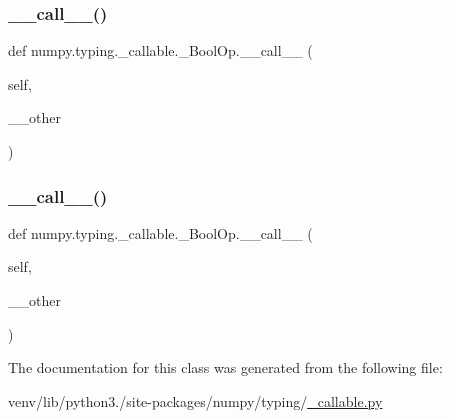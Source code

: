 \subsubsection{\texorpdfstring{\+\_\+\+\_\+call\+\_\+\+\_\+()}{\_\_call\_\_()}\hspace{0.1cm}{\footnotesize\ttfamily [4/5]}}
{\footnotesize\ttfamily def numpy.\+typing.\+\_\+callable.\+\_\+\+Bool\+Op.\+\_\+\+\_\+call\+\_\+\+\_\+ (\begin{DoxyParamCaption}\item[{}]{self,  }\item[{}]{\+\_\+\+\_\+other }\end{DoxyParamCaption})}

\mbox{\label{classnumpy_1_1typing_1_1__callable_1_1__BoolOp_af99dcaaa1aa2881d3ed4ad2f8663d85e}} 
\subsubsection{\texorpdfstring{\+\_\+\+\_\+call\+\_\+\+\_\+()}{\_\_call\_\_()}\hspace{0.1cm}{\footnotesize\ttfamily [5/5]}}
{\footnotesize\ttfamily def numpy.\+typing.\+\_\+callable.\+\_\+\+Bool\+Op.\+\_\+\+\_\+call\+\_\+\+\_\+ (\begin{DoxyParamCaption}\item[{}]{self,  }\item[{}]{\+\_\+\+\_\+other }\end{DoxyParamCaption})}



The documentation for this class was generated from the following file\+:\begin{DoxyCompactItemize}
\item 
venv/lib/python3./site-\/packages/numpy/typing/\hyperlink{__callable_8py}{\+\_\+callable.\+py}\end{DoxyCompactItemize}
